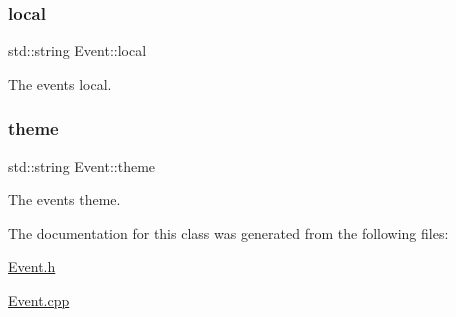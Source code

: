 \subsubsection{\texorpdfstring{local}{local}}
{\footnotesize\ttfamily std\+::string Event\+::local\hspace{0.3cm}{\ttfamily [protected]}}



The event\textquotesingle{}s local. 

\mbox{\label{classEvent_aa9cc4378d5cecaadc8e6de92b313e6f8}} 
\subsubsection{\texorpdfstring{theme}{theme}}
{\footnotesize\ttfamily std\+::string Event\+::theme\hspace{0.3cm}{\ttfamily [protected]}}



The event\textquotesingle{}s theme. 



The documentation for this class was generated from the following files\+:\begin{DoxyCompactItemize}
\item 
\hyperlink{Event_8h}{Event.\+h}\item 
\hyperlink{Event_8cpp}{Event.\+cpp}\end{DoxyCompactItemize}
